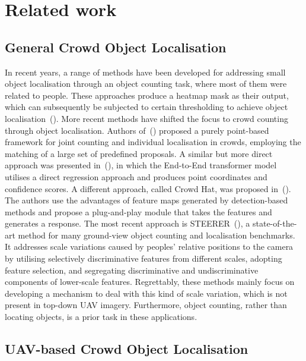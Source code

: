 \section{Related work}
\label{sec:Related_work}

\subsection{General Crowd Object Localisation}

In recent years, a range of methods have been developed for addressing small object localisation through an object counting task, where most of them were related to people. These approaches produce a heatmap mask as their output, which can subsequently be subjected to certain thresholding to achieve object localisation~(\cite{liu2019context,li2018csrnet,wang2020distribution}). More recent methods have shifted the focus to crowd counting through object localisation. Authors of~(\cite{song2021rethinking}) proposed a purely point-based framework for joint counting and individual localisation in crowds, employing the matching of a large set of predefined proposals. A similar but more direct approach was presented in~(\cite{liang2022end}), in which the End-to-End transformer model utilises a direct regression approach and produces point coordinates and confidence scores. A different approach, called Crowd Hat, was proposed in~(\cite{wu2023boosting}). The authors use the advantages of feature maps generated by detection-based methods and propose a plug-and-play module that takes the features and generates a response. The most recent approach is STEERER~(\cite{han2023steerer}), a state-of-the-art method for many ground-view object counting and localisation benchmarks. It addresses scale variations caused by peoples' relative positions to the camera by utilising selectively discriminative features from different scales, adopting feature selection, and segregating discriminative and undiscriminative components of lower-scale features. Regrettably, these methods mainly focus on developing a mechanism to deal with this kind of scale variation, which is not present in top-down UAV imagery. Furthermore, object counting, rather than locating objects, is a prior task in these applications.

\subsection{UAV-based Crowd Object Localisation}

